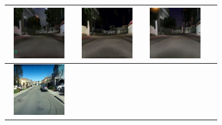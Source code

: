 \documentclass{VUMIFPSbakalaurinis}
\begin{document}
\begin{table}[H]
{\begin{tabular}{|c|c|c|c|}
            \includegraphics[width=100,height=85]{img/pvz/1_cycle} & \includegraphics[width=100,height=85]{img/pvz/1_cut} & \includegraphics[width=100,height=85]{img/pvz/1_mspc}
            \\
            \hline
            \includegraphics[width=100,height=85]{img/pvz/3_real} & 

\end{tabular}}
\end{table}
\end{document}
